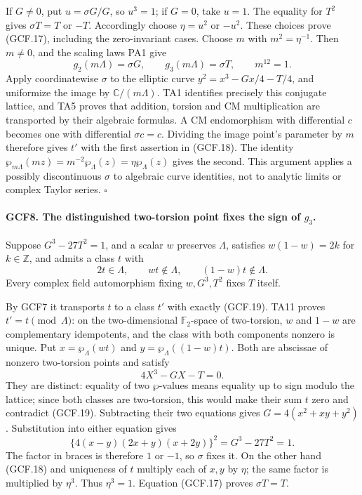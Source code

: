 If \(G\ne0\), put \(u=\sigma G/G\), so \(u^3=1\);
if \(G=0\), take \(u=1\).  The equality for \(T^2\) gives
\(\sigma T=T\) or \(-T\).  Accordingly choose
\(\eta=u^2\) or \(-u^2\).  These choices prove (GCF.17), including
the zero-invariant cases.  Choose \(m\) with \(m^2=\eta^{-1}\).
Then \(m\ne0\), and the scaling laws PA1 give
\[
 g_2(m\Lambda)=\sigma G,\qquad
 g_3(m\Lambda)=\sigma T,\qquad m^{12}=1.
\]
Apply coordinatewise \(\sigma\) to the elliptic curve
\(y^2=x^3-Gx/4-T/4\), and uniformize the image by
\(\mathbb C/(m\Lambda)\).  TA1 identifies precisely this
conjugate lattice, and TA5 proves that addition, torsion and CM
multiplication are transported by their algebraic formulas.  A
CM endomorphism with differential \(c\) becomes one with differential
\(\sigma c=c\).  Dividing the image point's parameter by \(m\)
therefore gives \(t'\) with the first assertion in (GCF.18).
The identity
\(\wp_{m\Lambda}(mz)=m^{-2}\wp_\Lambda(z)=\eta\wp_\Lambda(z)\)
gives the second.  This argument applies a possibly discontinuous
\(\sigma\) to algebraic curve identities, not to analytic limits or
complex Taylor series.
\hfill\(\square\)

\paragraph{GCF8. The distinguished two-torsion point fixes the sign of \(g_3\).}
\label{claim:GCF8}
Suppose \(G^3-27T^2=1\), and a scalar \(w\) preserves
\(\Lambda\), satisfies \(w(1-w)=2k\) for \(k\in\mathbb Z\),
and admits a class \(t\) with
\[
       2t\in\Lambda,\qquad wt\notin\Lambda,\qquad
                                      (1-w)t\notin\Lambda.
 \tag{GCF.19}
\]
Every complex field automorphism fixing \(w,G^3,T^2\) fixes
\(T\) itself.

By GCF7 it transports \(t\) to a class \(t'\) with exactly
(GCF.19).  TA11 proves \(t'=t\pmod\Lambda\): on the
two-dimensional \(\mathbb F_2\)-space of two-torsion, \(w\) and
\(1-w\) are complementary idempotents, and the class with both
components nonzero is unique.  Put
\(x=\wp_\Lambda(wt)\) and \(y=\wp_\Lambda((1-w)t)\).
Both are abscissae of nonzero two-torsion points and satisfy
\[
                 4X^3-GX-T=0.                        \tag{GCF.20}
\]
They are distinct: equality of two \(\wp\)-values means equality
up to sign modulo the lattice; since both classes are two-torsion,
this would make their sum \(t\) zero and contradict (GCF.19).
Subtracting their two equations gives
\(G=4(x^2+xy+y^2)\).  Substitution into either equation gives
\[
 \{4(x-y)(2x+y)(x+2y)\}^2=G^3-27T^2=1.               \tag{GCF.21}
\]
The factor in braces is therefore \(1\) or \(-1\), so \(\sigma\)
fixes it.  On the other hand (GCF.18) and uniqueness of \(t\)
multiply each of \(x,y\) by \(\eta\); the same factor is multiplied
by \(\eta^3\).  Thus \(\eta^3=1\).  Equation (GCF.17) proves
\(\sigma T=T\).


